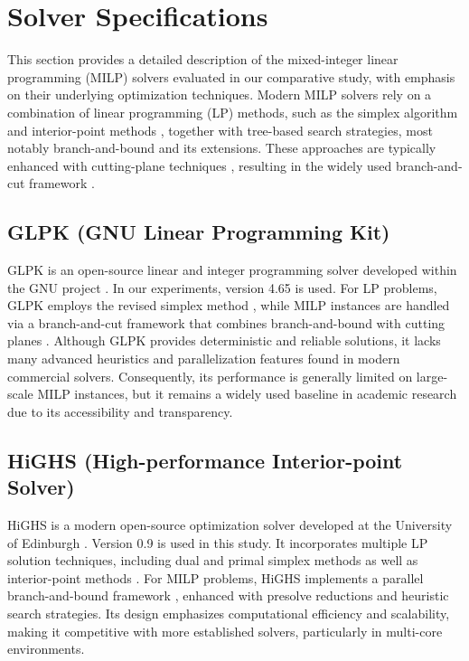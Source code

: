 \section{Solver Specifications}

This section provides a detailed description of the mixed-integer linear programming (MILP) solvers evaluated in our comparative study, with emphasis on their underlying optimization techniques. Modern MILP solvers rely on a combination of linear programming (LP) methods, such as the simplex algorithm \cite{dantzig1963linear} and interior-point methods \cite{karmarkar1984interior}, together with tree-based search strategies, most notably branch-and-bound \cite{land1960automatic} and its extensions. These approaches are typically enhanced with cutting-plane techniques \cite{gomory1958outline}, resulting in the widely used branch-and-cut framework \cite{nemhauser1988integer,wolsey1998integer}.

\subsection{GLPK (GNU Linear Programming Kit)}

GLPK is an open-source linear and integer programming solver developed within the GNU project \cite{glpk2024}. In our experiments, version 4.65 is used. For LP problems, GLPK employs the revised simplex method \cite{dantzig1963linear}, while MILP instances are handled via a branch-and-cut framework that combines branch-and-bound \cite{land1960automatic} with cutting planes \cite{gomory1958outline}. Although GLPK provides deterministic and reliable solutions, it lacks many advanced heuristics and parallelization features found in modern commercial solvers. Consequently, its performance is generally limited on large-scale MILP instances, but it remains a widely used baseline in academic research due to its accessibility and transparency.

\subsection{HiGHS (High-performance Interior-point Solver)}

HiGHS is a modern open-source optimization solver developed at the University of Edinburgh \cite{highs2023}. Version 0.9 is used in this study. It incorporates multiple LP solution techniques, including dual and primal simplex methods \cite{dantzig1963linear} as well as interior-point methods \cite{karmarkar1984interior}. For MILP problems, HiGHS implements a parallel branch-and-bound framework \cite{land1960automatic}, enhanced with presolve reductions and heuristic search strategies. Its design emphasizes computational efficiency and scalability, making it competitive with more established solvers, particularly in multi-core environments.


